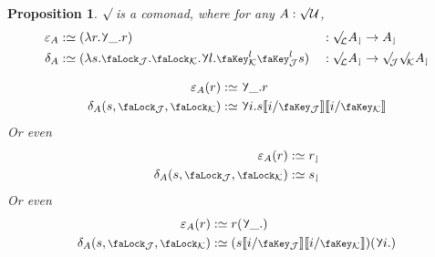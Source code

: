 \documentclass[10pt]{article}
\newtheorem{proposition}[theorem]{Proposition}
\theoremstyle{definition}
\let\oldequiv\equiv%
\renewcommand{\equiv}{\simeq}
\newcommand{\defeq}{\oldequiv}
\newcommand*{\univ}{\mathcal{U}}
\newcommand{\lock}{\mathchoice {\scalebox{0.8}{\text{\faLock}}}
  {\scalebox{0.8}{\text{\faLock}}} {\scalebox{0.5}{\text{\faLock}}}
  {\scalebox{0.4}{\text{\faLock}}} }
\newcommand{\key}{\mathchoice
  {\scalebox{0.8}{\text{\faKey}}} {\scalebox{0.8}{\text{\faKey}}}
  {\scalebox{0.5}{\text{\faKey}}} {\scalebox{0.4}{\text{\faKey}}} }
\newcommand{\rbindsym}{\raisebox{-0.5pt}{\scalerel*{\reflectbox{\rotatebox[origin=c]{185}{$\lambda$}}}{\lambda}}}
\newcommand{\rbind}[1]{\rbindsym{} #1.}
\newcommand{\lockn}[1]{\mathcal{#1}}
\newcommand{\varkeye}[2]{\key_{#1}^{#2}}
\newcommand{\varkey}[2]{\varkeye{\lockn{#1}}{#2}}
\newcommand{\ctxlocke}[1]{\lock_{#1}}
\newcommand{\ctxlock}[1]{\ctxlocke{\lockn{#1}}}
\newcommand{\stubra}[1]{\llbracket #1 \rrbracket}
\newcommand{\substucke}[2]{\stubra{#1/\key_{#2}}}
\newcommand{\substuck}[2]{\substucke{#1}{\lockn{#2}}}
\newcommand{\rformsym}{\surd}
\newcommand{\rforme}[2]{\ThisStyle{\raisebox{0.07em}{$\SavedStyle \rformsym_{\hspace{-0.25em}#1}$}} #2}
\newcommand{\rform}[2]{\rforme{\lockn{#1}}{#2}}
\newcommand{\rformu}[1]{\ThisStyle{\raisebox{0.07em}{$\SavedStyle \rformsym$}} #1}
\newcommand{\rintroe}[2]{\lock_{#1}. #2}
\newcommand{\rintro}[2]{\rintroe{\lockn{#1}}{#2}}
\newcommand{\relim}[1]{\rbindsym #1}
\newcommand{\rget}[1]{{#1}_{\downharpoonleft}}
\begin{document}
\begin{proposition}
  $\rform{}$ is a comonad, where for any $A : \rformu \univ$,
  \begin{alignat*}{2}
    \varepsilon_A &:\defeq (\lambda r. \relim{\_.r}) &&: \rform{L} \rget{A} \to \rget{A} \\
    \delta_A &:\defeq (\lambda s. \rintro{J}{\rintro{K}{\relim{l.\varkey{K}{l}\varkey{J}{l}s}}}) &&: \rform{L} \rget{A} \to \rform{J} \rform{K} \rget{A}
  \end{alignat*}

  \begin{align*}
    \varepsilon_A(r)
    &:\defeq \relim{\_.r} \\
    \delta_A(s, \ctxlock{J}, \ctxlock{K})
    &:\defeq \relim{i.s\substuck{i}{J}\substuck{i}{K}}
  \end{align*}
  Or even
  \begin{align*}
    \varepsilon_A(r) &:\defeq \rget{r} \\
    \delta_A(s, \ctxlock{J}, \ctxlock{K}) &:\defeq \rget{s}
  \end{align*}
  Or even
  \begin{align*}
    \varepsilon_A(r) &:\defeq r(\rbind{\_}) \\
    \delta_A(s, \ctxlock{J}, \ctxlock{K}) &:\defeq (s\substuck{i}{J}\substuck{i}{K})(\rbind{i})
  \end{align*}
\end{proposition}
\end{document}
